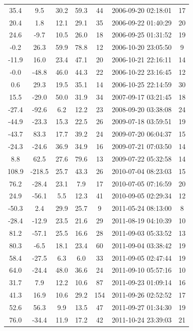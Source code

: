 \documentclass[12pt,a4paper]{report}
\begin{document}
\begin{longtable}{|c|c|c|c|c|c|c|}
35.4 & 9.5 & 30.2 & 59.3 &  44 & 2006-09-20 02:18:01 &  17 \\
20.4 & 1.8 & 12.1 & 29.1 &  35 & 2006-09-22 01:40:29 &  20 \\
24.6 & -9.7 & 10.5 & 26.0 &  18 & 2006-09-25 01:31:52 &  19 \\
-0.2 & 26.3 & 59.9 & 78.8 &  12 & 2006-10-20 23:05:50 &   9 \\
-11.9 & 16.0 & 23.4 & 47.1 &  20 & 2006-10-21 22:16:11 &  14 \\
-0.0 & -48.8 & 46.0 & 44.3 &  22 & 2006-10-22 23:16:45 &  12 \\
0.6 & 29.3 & 19.5 & 35.1 &  14 & 2006-10-25 22:14:59 &  30 \\
15.5 & -29.0 & 50.0 & 31.9 &  34 & 2007-09-17 03:21:45 &  18 \\
-27.4 & -92.6 & 6.2 & 12.2 &  23 & 2008-09-20 03:38:08 &  24 \\
-44.9 & -23.3 & 15.3 & 22.5 &  26 & 2009-07-18 03:59:51 &  19 \\
-43.7 & 83.3 & 17.7 & 39.2 &  24 & 2009-07-20 06:04:37 &  15 \\
-24.3 & -24.6 & 36.9 & 34.9 &  16 & 2009-07-21 07:03:50 &  14 \\
8.8 & 62.5 & 27.6 & 79.6 &  13 & 2009-07-22 05:32:58 &  14 \\
108.9 & -218.5 & 25.7 & 43.3 &  26 & 2010-07-04 08:23:03 &  15 \\
76.2 & -28.4 & 23.1 & 7.9 &  17 & 2010-07-05 07:16:59 &  20 \\
24.9 & -56.1 & 5.5 & 12.3 &  41 & 2010-09-05 02:29:34 &  12 \\
-50.3 & 2.4 & 29.9 & 25.7 &   9 & 2011-05-24 08:13:00 &   8 \\
-28.4 & -12.9 & 23.5 & 21.6 &  29 & 2011-08-19 04:10:39 &  10 \\
81.2 & -57.1 & 25.5 & 16.6 &  28 & 2011-09-03 05:33:52 &  13 \\
80.3 & -6.5 & 18.1 & 23.4 &  60 & 2011-09-04 03:38:42 &  19 \\
58.4 & -27.5 & 6.3 & 6.0 &  33 & 2011-09-05 02:47:44 &  19 \\
64.0 & -24.4 & 48.0 & 36.6 &  24 & 2011-09-10 05:57:16 &  10 \\
31.7 & 7.9 & 12.2 & 10.6 &  87 & 2011-09-23 01:09:14 &  16 \\
41.3 & 16.9 & 10.6 & 29.2 & 154 & 2011-09-26 02:52:52 &  17 \\
52.6 & 56.3 & 9.9 & 13.5 &  47 & 2011-09-27 01:34:30 &  19 \\
76.0 & -34.4 & 11.9 & 17.2 &  42 & 2011-10-24 23:39:03 &  21 \\

\end{longtable}
\end{document}
